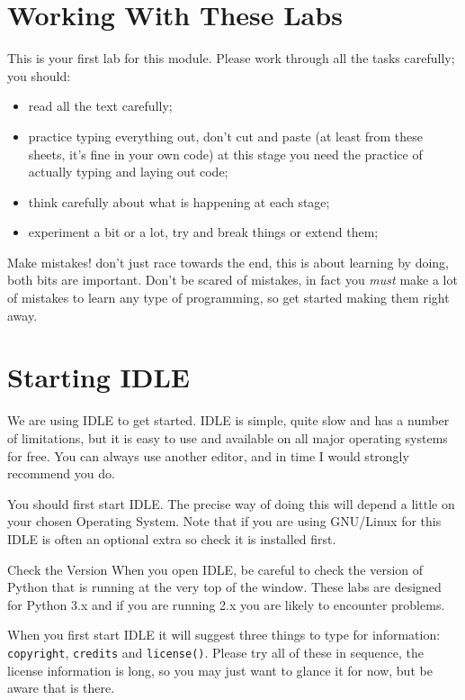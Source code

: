 \documentclass[12pt,oneside]{cttutorial}
\begin{document}
\section{Working With These Labs}

This is your first lab for this module. Please work through all the tasks carefully; you should:
\begin{itemize}
\item read all the text carefully;
\item practice typing everything out, don't cut and paste (at least from these sheets, it's fine in your own code) at this stage you need the practice of actually typing and laying out code;
\item think carefully about what is happening at each stage;
\item experiment a bit or a lot, try and break things or extend them;
\end{itemize}
\alert{Make mistakes!}
don't just race towards the end, this is about learning by doing, both bits are important. Don't be scared of mistakes, in fact you \emph{must} make a lot of mistakes to learn any type of programming, so get started making them right away.

\section{Starting IDLE}

We are using IDLE to get started. IDLE is simple, quite slow and has a number of limitations, but it is easy to use and available on all major operating systems for free. You can always use another editor, and in time I would strongly recommend you do.

You should first start IDLE. The precise way of doing this will depend a little on your chosen Operating System.
Note that if you are using GNU/Linux for this IDLE is often an optional extra so check it is installed first.

\alert{Check the Version}
When you open IDLE, be careful to check the version of Python that is running at the very top of the window. These labs are designed for Python 3.x and if you are running 2.x you are likely to encounter problems.

When you first start IDLE it will suggest three things to type for information: \lstinline!copyright!, \lstinline!credits! and \lstinline!license()!.
Please try all of these in sequence, the license information is long, so you may just want to glance it for now, but be aware that is there.
\end{document}
